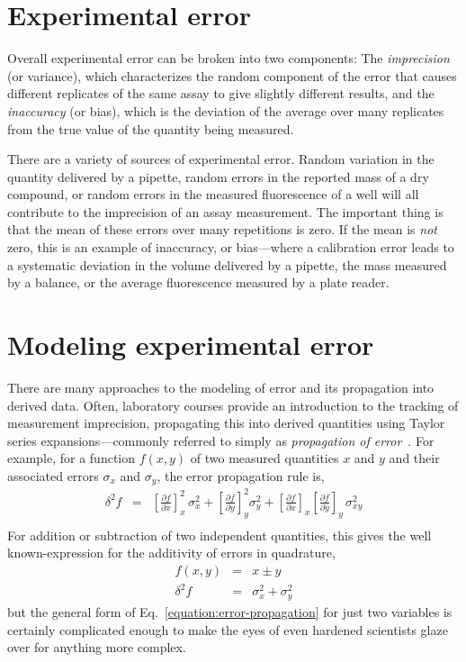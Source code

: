 \documentclass[aps,pre,twocolumn,nofootinbib,superscriptaddress,linenumbers]{revtex4-1}
\begin{document}
\section{Experimental error}

Overall experimental error can be broken into two components: The \emph{imprecision} (or variance), which characterizes the random component of the error that causes different replicates of the same assay to give slightly different results, and the \emph{inaccuracy} (or bias), which is the deviation of the average over many replicates from the true value of the quantity being measured.

There are a variety of sources of experimental error. 
Random variation in the quantity delivered by a pipette, random errors in the reported mass of a dry compound, or random errors in the measured fluorescence of a well will all contribute to the imprecision of an assay measurement.
The important thing is that the mean of these errors over many repetitions is zero. 
If the mean is \emph{not} zero, this is an example of inaccuracy, or bias---where a calibration error leads to a systematic deviation in the volume delivered by a pipette, the mass measured by a balance, or the average fluorescence measured by a plate reader.

\section*{Modeling experimental error}

There are many approaches to the modeling of error and its propagation into derived data.
Often, laboratory courses provide an introduction to the tracking of measurement imprecision, propagating this into derived quantities using Taylor series expansions---commonly referred to simply as \emph{propagation of error}~\cite{taylor_introduction_1997}.
For example, for a function $f(x,y)$ of two measured quantities $x$ and $y$ and their associated errors $\sigma_x$ and $\sigma_y$, the error propagation rule is,
\begin{eqnarray}
\delta^2 f &=& \left[\frac{\partial f}{\partial x}\right]^2_x \, \sigma^2_x + \left[\frac{\partial f}{\partial y}\right]^2_y \sigma^2_y + \left[\frac{\partial f}{\partial x}\right]_x \left[\frac{\partial f}{\partial y}\right]_y \, \sigma^2_{xy} \nonumber \\ \label{equation:error-propagation}
\end{eqnarray}
For addition or subtraction of two independent quantities, this gives the well known-expression for the additivity of errors in quadrature,
\begin{eqnarray}
f(x,y) &=& x \pm y \nonumber \\
\delta^2 f &=& \sigma^2_x + \sigma^2_y 
\end{eqnarray}
but the general form of Eq.~\ref{equation:error-propagation} for just two variables is certainly complicated enough to make the eyes of even hardened scientists glaze over for anything more complex.
\end{document}
